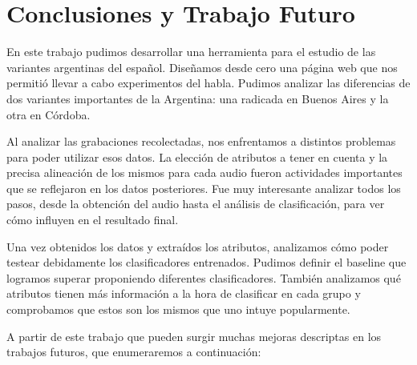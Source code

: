 \chapter{Conclusiones y Trabajo Futuro}

En este trabajo pudimos desarrollar una herramienta para el estudio de las variantes argentinas del español. Diseñamos desde cero una página web que nos permitió llevar a cabo experimentos del habla. Pudimos analizar las diferencias de dos variantes importantes de la Argentina: una radicada en Buenos Aires y la otra en Córdoba. 

Al analizar las grabaciones recolectadas, nos enfrentamos a distintos problemas para poder utilizar esos datos. La elección de atributos a tener en cuenta y la precisa alineación de los mismos para cada audio fueron actividades importantes que se reflejaron en los datos posteriores. Fue muy interesante analizar todos los pasos, desde la obtención del audio hasta el análisis de clasificación, para ver cómo influyen en el resultado final.

Una vez obtenidos los datos y extraídos los atributos, analizamos cómo poder testear debidamente los clasificadores entrenados. Pudimos definir el baseline que logramos superar proponiendo diferentes clasificadores. También analizamos qué atributos tienen más información a la hora de clasificar en cada grupo y comprobamos que estos son los mismos que uno intuye popularmente.

A partir de este trabajo que pueden surgir muchas mejoras descriptas en los trabajos futuros, que enumeraremos a continuación:

